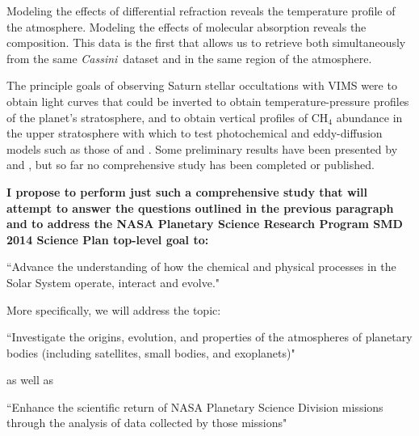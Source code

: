 \documentclass[preprint]{aastex}
\newcommand{\Cas}{{\it Cassini}}
\begin{document}
\begin{multicols}{2}
Modeling the effects of differential refraction reveals the temperature profile
of the atmosphere. Modeling the effects of molecular absorption reveals the
composition. This data is the first that allows us to retrieve both
simultaneously from the same \Cas~dataset and in the same region of the atmosphere.

The principle goals of observing Saturn stellar occultations with VIMS were to
obtain light curves that could be inverted to obtain temperature-pressure
profiles of the planet's stratosphere, and to obtain vertical profiles of
CH$_4$ abundance in the upper stratosphere with which to test photochemical and
eddy-diffusion models such as those of \cite{Moses00} and \cite{Moses05}. Some
preliminary results have been presented by \cite{Nicholson06} and
\cite{Banfield11}, but so far no comprehensive study has been completed or
published.

{\bf I propose to perform just such a comprehensive study that will attempt to
answer the questions outlined in the previous paragraph and to address the NASA
Planetary Science Research Program SMD 2014 Science Plan top-level goal to:

``Advance the understanding of how the chemical and physical processes in the Solar System
operate, interact and evolve."

More specifically, we will address the topic:

``Investigate the origins, evolution, and properties of the atmospheres of
planetary bodies (including satellites, small bodies, and exoplanets)" 

as well as

``Enhance the scientific return of NASA Planetary Science Division missions
through the analysis of data collected by those missions" }


\end{multicols}
\end{document}
